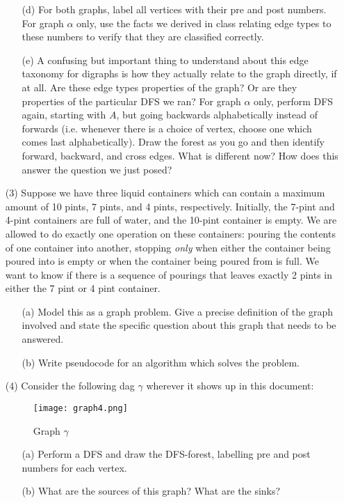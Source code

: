 \documentclass[12pt]{article}
\begin{document}
\begin{enumerate}
\begin{itemize}
    \item[(d)] For both graphs, label all vertices with their pre and post numbers. For graph $\alpha$ only, use the facts we derived in class relating edge types to these numbers to verify that they are classified correctly.
    \item[(e)] A confusing but important thing to understand about this edge taxonomy for digraphs is how they actually relate to the graph directly, if at all. Are these edge types properties of the graph? Or are they properties of the particular DFS we ran? For graph $\alpha$ only, perform DFS again, starting with $A$, but going backwards alphabetically instead of forwards (i.e. whenever there is a choice of vertex, choose one which comes last alphabetically). Draw the forest as you go and then identify forward, backward, and cross edges. What is different now? How does this answer the question we just posed?
\end{itemize}
\item[(3)] Suppose we have three liquid containers which can contain a maximum amount of 10 pints, 7 pints, and 4 pints, respectively. Initially, the 7-pint and 4-pint containers are full of water, and the 10-pint container is empty. We are allowed to do exactly one operation on these containers: pouring the contents of one container into another, stopping \emph{only} when either the container being poured into is empty or when the container being poured from is full. We want to know if there is a sequence of pourings that leaves exactly 2 pints in either the 7 pint or 4 pint container.
\begin{itemize}
    \item[(a)] Model this as a graph problem. Give a precise definition of the graph involved and state the specific question about this graph that needs to be answered. 
    \item[(b)] Write pseudocode for an algorithm which solves the problem.
\end{itemize}  
\item[(4)] Consider the following dag $\gamma$ wherever it shows up in this document:
\begin{figure}[h]
    \centering
    \texttt{[image: graph4.png]}
    \caption{Graph $\gamma$}
\end{figure}
\begin{itemize}
    \item[(a)] Perform a DFS and draw the DFS-forest, labelling pre and post numbers for each vertex. 
    \item[(b)] What are the sources of this graph? What are the sinks?

\end{itemize}
\end{enumerate}
\end{document}
